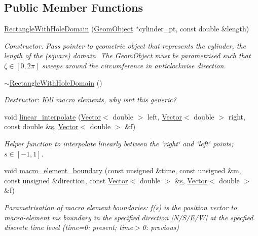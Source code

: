\subsection*{Public Member Functions}
\begin{DoxyCompactItemize}
\item 
\hyperlink{classoomph_1_1RectangleWithHoleDomain_a3c685f6d35bb842d50062ccaa63a5486}{Rectangle\+With\+Hole\+Domain} (\hyperlink{classoomph_1_1GeomObject}{Geom\+Object} $\ast$cylinder\+\_\+pt, const double \&length)
\begin{DoxyCompactList}\small\item\em Constructor. Pass pointer to geometric object that represents the cylinder, the length of the (square) domain. The \hyperlink{classoomph_1_1GeomObject}{Geom\+Object} must be parametrised such that $\zeta \in [0,2\pi]$ sweeps around the circumference in anticlockwise direction. \end{DoxyCompactList}\item 
\hyperlink{classoomph_1_1RectangleWithHoleDomain_adae7fabe3167ec35c1c0d4af813a4dca}{$\sim$\+Rectangle\+With\+Hole\+Domain} ()
\begin{DoxyCompactList}\small\item\em Destructor\+: Kill macro elements, why isn\textquotesingle{}t this generic? \end{DoxyCompactList}\item 
void \hyperlink{classoomph_1_1RectangleWithHoleDomain_a9548ab705821b22c43850b658a893fd8}{linear\+\_\+interpolate} (\hyperlink{classoomph_1_1Vector}{Vector}$<$ double $>$ left, \hyperlink{classoomph_1_1Vector}{Vector}$<$ double $>$ right, const double \&\hyperlink{cfortran_8h_ab7123126e4885ef647dd9c6e3807a21c}{s}, \hyperlink{classoomph_1_1Vector}{Vector}$<$ double $>$ \&f)
\begin{DoxyCompactList}\small\item\em Helper function to interpolate linearly between the \char`\"{}right\char`\"{} and \char`\"{}left\char`\"{} points; $ s \in [-1,1] $. \end{DoxyCompactList}\item 
void \hyperlink{classoomph_1_1RectangleWithHoleDomain_a514085f80059aa9f0cc3334a3cb408c1}{macro\+\_\+element\+\_\+boundary} (const unsigned \&time, const unsigned \&m, const unsigned \&direction, const \hyperlink{classoomph_1_1Vector}{Vector}$<$ double $>$ \&\hyperlink{cfortran_8h_ab7123126e4885ef647dd9c6e3807a21c}{s}, \hyperlink{classoomph_1_1Vector}{Vector}$<$ double $>$ \&f)
\begin{DoxyCompactList}\small\item\em Parametrisation of macro element boundaries\+: f(s) is the position vector to macro-\/element m\textquotesingle{}s boundary in the specified direction \mbox{[}N/\+S/\+E/W\mbox{]} at the specfied discrete time level (time=0\+: present; time$>$0\+: previous) \end{DoxyCompactList}\end{DoxyCompactItemize}
